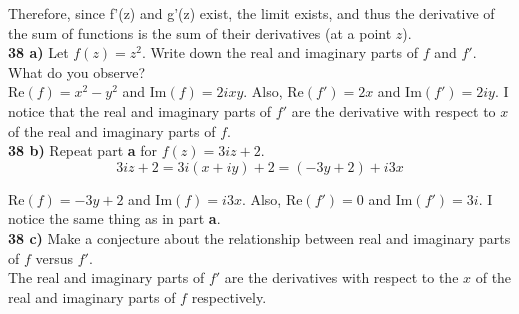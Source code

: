 \documentclass{scrartcl}
\begin{document}
Therefore, since f'(z) and g'(z) exist, the limit exists, and thus the derivative of the sum of functions is the sum of their derivatives (at a point $z$).\\

\textbf{38 a)} Let $f(z) = z^2$. Write down the real and imaginary parts of $f$ and $f'$. What do you observe?\\

Re$(f) = x^2 - y^2$ and Im$(f) = 2ixy$. Also, Re$(f') = 2x$ and Im$(f') = 2iy$. I notice that the real and imaginary parts of $f'$ are the derivative with respect to $x$ of the real and imaginary parts of $f$.\\

\textbf{38 b)} Repeat part \textbf{a} for $f(z) = 3iz + 2$.\\

$$3iz + 2 = 3i(x + iy) + 2 = (-3y + 2) + i3x$$

Re$(f) = -3y + 2$ and Im$(f) = i3x$. Also, Re$(f') = 0$ and Im$(f') = 3i$. I notice the same thing as in part \textbf{a}.\\

\textbf{38 c)} Make a conjecture about the relationship between real and imaginary parts of $f$ versus $f'$.\\

The real and imaginary parts of $f'$ are the derivatives with respect to the $x$ of the real and imaginary parts of $f$ respectively.
\end{document}
